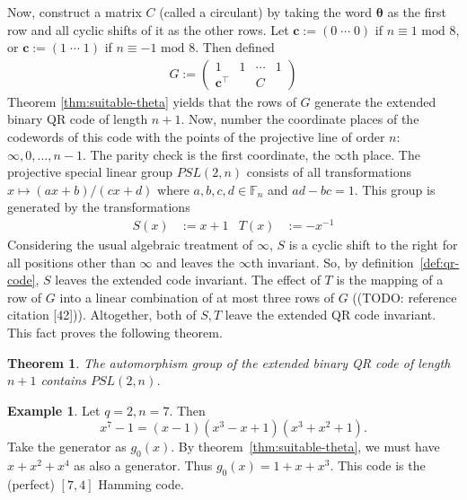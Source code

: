\documentclass{article}
\newcommand{\F}{\mathbb{F}}
\renewcommand{\mod}{\text{ mod }}
\newcommand{\trans}[1]{#1^\top}
\newcommand{\mt}{\mapsto}
\renewcommand{\=}{\equiv}
\renewcommand{\i}{^{-1}}
\renewcommand{\v}{\mathbf}
\theoremstyle{plain}
\newtheorem{thm}{Theorem}[subsection]
\newtheorem*{cor}{Corollary}
\theoremstyle{definition}
\newtheorem{exmp}{Example}[subsection]
\newcommand{\TODO}[1]{(TODO: #1)}
\begin{document}
Now, construct a matrix $C$ (called a circulant) by taking the word $\v \theta$ as the first row and all cyclic shifts of it as the other rows.
Let $\v c := (0 \; \cdots \; 0)$ if $n \= 1 \mod 8$, or $\v c := (1 \; \cdots \; 1)$ if $n \= -1 \mod 8$.
Then defined
\begin{align}
  G := \begin{pmatrix}
    1 & 1 & \cdots & 1 \\
    \trans{\v c} & & C &
  \end{pmatrix}
\end{align}
Theorem \ref{thm:suitable-theta} yields that the rows of $G$ generate the extended binary QR code of length $n+1$.
Now, number the coordinate places of the codewords of this code with the points of the projective line of order $n$: $\infty, 0, \dots, n-1$.
The parity check is the first coordinate, the $\infty$th place.
The projective special linear group $PSL(2,n)$ consists of all transformations $x \mt (ax + b)/(cx + d)$ where $a, b, c, d \in \F_n$ and $ad - bc = 1$.
This group is generated by the transformations
\begin{align*}
  S(x) &:= x + 1 & T(x) &:= -x\i
\end{align*}
Considering the usual algebraic treatment of $\infty$, $S$ is a cyclic shift to the right for all positions other than $\infty$ and leaves the $\infty$th invariant.
So, by definition~\ref{def:qr-code}, $S$ leaves the extended code invariant.
The effect of $T$ is the mapping of a row of $G$ into a linear combination of at most three rows of $G$ (\TODO{reference citation [42]}).
Altogether, both of $S,T$ leave the extended QR code invariant.
This fact proves the following theorem.

\begin{thm}
\label{thm:qr-auto}
The automorphism group of the extended binary QR code of length $n+1$ contains $PSL(2,n)$.
\end{thm}



\begin{exmp}
Let $q = 2, n = 7$.
Then
$$ x^7 - 1 = (x-1) (x^3 - x + 1) (x^3 + x^2 + 1). $$
Take the generator as $g_0(x)$.
By theorem~\ref{thm:suitable-theta}, we must have $x + x^2 + x^4$ as also a generator.
Thus $g_0(x) = 1 + x + x^3$.
This code is the (perfect) $[7,4]$ Hamming code. %
\end{exmp}
\end{document}
